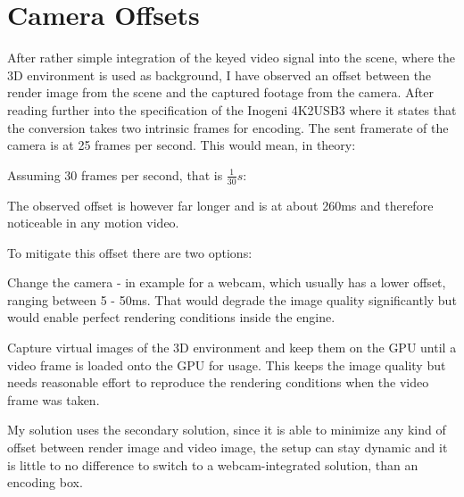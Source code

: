 \section{Camera Offsets}

After rather simple integration of the keyed video signal into the scene, where 
the 3D environment is used as background, I have observed an offset between the 
render image from the scene and the captured footage from the camera. After 
reading further into the specification of the Inogeni 4K2USB3 where it states 
that the conversion takes two intrinsic frames for encoding. The sent framerate 
of the camera is at 25 frames per second. This would mean, in theory:


Assuming 30 frames per second, that is $\frac{1}{30}s$:



The observed offset is however far longer and is at about 260ms and therefore 
noticeable in any motion video.


To mitigate this offset there are two options:

\begin{my_list}
	\item Change the camera - in example for a webcam, which usually has a 
	lower offset, ranging between 5 - 50ms. That would degrade the image 
	quality significantly but would enable perfect rendering conditions inside 
	the engine.
	\item Capture virtual images of the 3D environment and keep them on the GPU 
	until a video frame is loaded onto the GPU for usage. This keeps the image 
	quality but needs reasonable effort to reproduce the rendering conditions 
	when the video frame was taken. 
\end{my_list}

My solution uses the secondary solution, since it is able to minimize any kind 
of offset between render image and video image, the setup can stay dynamic and 
it is little to no difference to switch to a webcam-integrated solution, than 
an encoding box.

